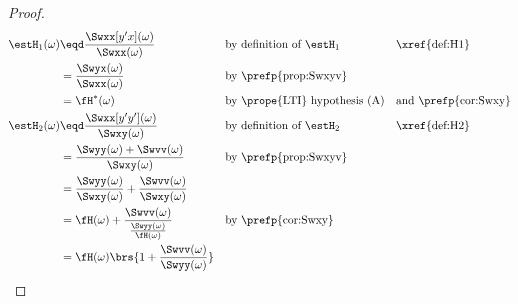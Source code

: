 \begin{proof}
\begin{align*}
  \estH_1(\omega)
    &\eqd \frac{\Swxx[y'x](\omega)}{\Swxx(\omega)}
    && \text{by definition of $\estH_1$}
    && \text{\xref{def:H1}}
  \\&=    \frac{\Swyx(\omega)}{\Swxx(\omega)}
    && \text{by \prefp{prop:Swxyv}}
  \\&= \fH^\ast(\omega)
    && \text{by \prope{LTI} hypothesis (A)}
    && \text{and \prefp{cor:Swxy}}
  \\
  \estH_2(\omega)
    &\eqd \frac{\Swxx[y'y'](\omega)}{\Swxy(\omega)}
    && \text{by definition of $\estH_2$}
    && \text{\xref{def:H2}}
  \\&=    \frac{\Swyy(\omega) + \Swvv(\omega)}{\Swxy(\omega)}
    && \text{by \prefp{prop:Swxyv}}
  \\&= \frac{\Swyy(\omega)}{\Swxy(\omega)}
     + \frac{\Swvv(\omega)}{\Swxy(\omega)}
  \\&= \fH(\omega)
     + \frac{\Swvv(\omega)}{\frac{\Swyy(\omega)}{\fH(\omega)}}
    && \text{by \prefp{cor:Swxy}}
  \\&= \fH(\omega)\brs{1 + \frac{\Swvv(\omega)}{\Swyy(\omega)}}
\end{align*}
\end{proof}

